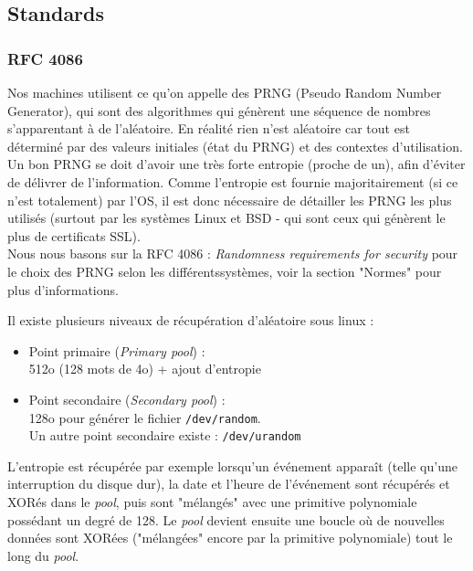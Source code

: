 \subsection{Standards}
	\subsubsection{RFC 4086}

			Nos machines utilisent ce qu'on appelle des PRNG (Pseudo Random Number Generator), qui sont des algorithmes qui génèrent une séquence de nombres s'apparentant à de l'aléatoire. En réalité rien n'est aléatoire car tout est déterminé par des valeurs initiales (état du PRNG) et des contextes d'utilisation.\\
			
			Un bon PRNG se doit d'avoir une très forte entropie (proche de un), afin d'éviter de délivrer de l'information.
		 Comme l'entropie est fournie majoritairement (si ce n'est totalement) par l'OS, il est donc nécessaire de détailler les PRNG les plus utilisés (surtout par les systèmes Linux et BSD - qui sont ceux qui génèrent le plus de certificats SSL).\\
		
			Nous nous basons sur la RFC 4086 \cite{rfc4086}: \textit{Randomness requirements for security} pour le choix des PRNG selon les différentssystèmes, voir la section "Normes" pour plus d'informations.	
	
		
			Il existe plusieurs niveaux de récupération d'aléatoire sous linux :\\
			\begin{itemize}
			\item Point primaire (\textit{Primary pool}) :\\
			512o (128 mots de 4o) + ajout d’entropie\\
			\item Point secondaire (\textit{Secondary pool}) :\\
			128o pour générer le fichier \texttt{/dev/random}. \\
			Un autre point secondaire existe : \texttt{/dev/urandom}\\
			\end{itemize}
			
			L'entropie est récupérée par exemple lorsqu'un événement apparaît (telle qu'une interruption du disque dur), la date et l'heure de l'événement sont récupérés et XORés dans le \textit{pool}, puis sont "mélangés" avec une primitive polynomiale possédant un degré de 128. Le \textit{pool} devient ensuite une boucle où de nouvelles données sont XORées ("mélangées" encore par la primitive polynomiale) tout le long du \textit{pool}.\\
			
